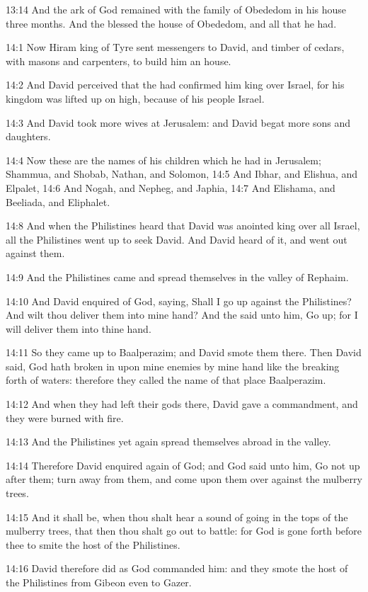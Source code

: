 13:14 And the ark of God remained with the family of Obededom in his
house three months. And the \LORD blessed the house of Obededom, and
all that he had.

14:1 Now Hiram king of Tyre sent messengers to David, and timber of
cedars, with masons and carpenters, to build him an house.

14:2 And David perceived that the \LORD had confirmed him king over
Israel, for his kingdom was lifted up on high, because of his people
Israel.

14:3 And David took more wives at Jerusalem: and David begat more sons
and daughters.

14:4 Now these are the names of his children which he had in
Jerusalem; Shammua, and Shobab, Nathan, and Solomon, 14:5 And Ibhar,
and Elishua, and Elpalet, 14:6 And Nogah, and Nepheg, and Japhia, 14:7
And Elishama, and Beeliada, and Eliphalet.

14:8 And when the Philistines heard that David was anointed king over
all Israel, all the Philistines went up to seek David. And David heard
of it, and went out against them.

14:9 And the Philistines came and spread themselves in the valley of
Rephaim.

14:10 And David enquired of God, saying, Shall I go up against the
Philistines? And wilt thou deliver them into mine hand? And the \LORD
said unto him, Go up; for I will deliver them into thine hand.

14:11 So they came up to Baalperazim; and David smote them there. Then
David said, God hath broken in upon mine enemies by mine hand like the
breaking forth of waters: therefore they called the name of that place
Baalperazim.

14:12 And when they had left their gods there, David gave a
commandment, and they were burned with fire.

14:13 And the Philistines yet again spread themselves abroad in the
valley.

14:14 Therefore David enquired again of God; and God said unto him, Go
not up after them; turn away from them, and come upon them over
against the mulberry trees.

14:15 And it shall be, when thou shalt hear a sound of going in the
tops of the mulberry trees, that then thou shalt go out to battle: for
God is gone forth before thee to smite the host of the Philistines.

14:16 David therefore did as God commanded him: and they smote the
host of the Philistines from Gibeon even to Gazer.

